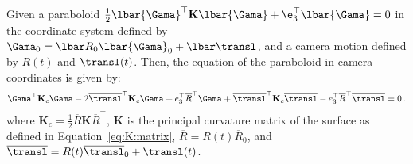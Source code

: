 \begin{proposition}
Given a paraboloid 
$\frac{1}{2}\lbar{\Gama}^\top\mathbf K\lbar{\Gama}
+ \e_3^\top\lbar{\Gama} = 0$ in the coordinate system defined by $\Gama_0 = \lbar
R_0\lbar{\Gama}_0 + \lbar\transl$,
and a camera motion defined by
$R(t)$ and $\transl(t)$. Then, the equation of the paraboloid in camera
coordinates is given by:
\begin{equation}\label{eq:BB:paraboloid:xyz:thru:gama}
\Gama^\top \mathbf K_c \Gama -2\overline \transl^\top \mathbf K_c\Gama + e_3^\top \overline R^\top\Gama +
 \overline \transl^\top \mathbf K_c \overline \transl - e_3^\top \overline
 R^\top \overline \transl = 0\,.
\end{equation}
where $\mathbf K_c = \frac{1}{2}\overline R \mathbf K \overline R^\top$, 
$\mathbf K$ is the principal curvature matrix of the surface as defined in
Equation~\eqref{eq:K:matrix}, $\overline R = R(t)\overline R_0$, and $\overline
\transl = R(t)\overline\transl_0 + \transl(t)$.
\end{proposition}
